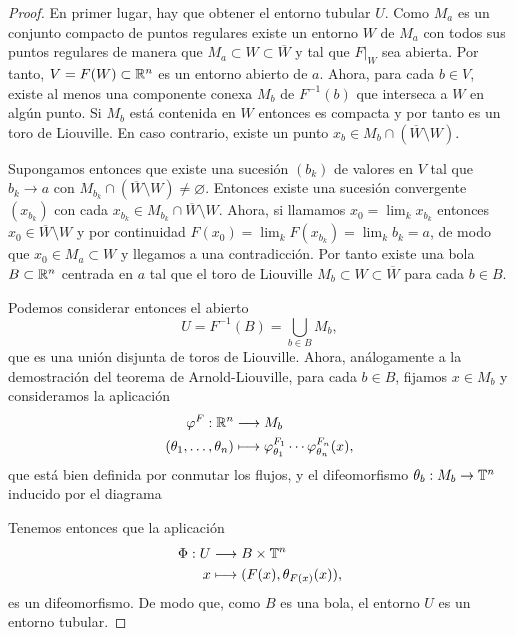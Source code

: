 \begin{proof}
  En primer lugar, hay que obtener el entorno tubular $U$. Como $M_a$ es un conjunto compacto de puntos regulares existe un entorno $W$ de $M_a$ con todos sus puntos regulares de manera que $M_a\subset W \subset \overline{W}$ y tal que $F|_W$ sea abierta. Por tanto, $V=F(W)\subset \mathbb{R}^n$ es un entorno abierto de $a$. Ahora, para cada $b\in V$, existe al menos una componente conexa $M_b$ de $F^{-1}(b)$ que interseca a $W$ en algún punto. Si $M_b$ está contenida en $W$ entonces es compacta y por tanto es un toro de Liouville. En caso contrario, existe un punto $x_b\in M_{b}\cap (\overline{W}\setminus W)$.
  
  Supongamos entonces que existe una sucesión $(b_k)$ de valores en $V$ tal que $b_k\rightarrow a$ con $M_{b_k}\cap(\overline{W}\setminus W) \neq \varnothing$. Entonces existe una sucesión convergente $(x_{b_k})$ con cada $x_{b_k}\in M_{b_k}\cap \overline{W}\setminus W$. Ahora, si llamamos $x_0=\lim_k x_{b_k}$ entonces $x_0\in \overline{W}\setminus W$ y por continuidad $F(x_0)=\lim_k F(x_{b_k})=\lim_k b_k =a$, de modo que $x_0 \in M_a\subset W$ y llegamos a una contradicción. Por tanto existe una bola $B\subset \mathbb{R}^n$ centrada en $a$ tal que el toro de Liouville $M_b\subset W \subset \overline{W}$ para cada $b\in B$. 
  
  Podemos considerar entonces el abierto 
  \begin{equation*}
    U=F^{-1}(B)=\bigcup_{b\in B}M_b,
  \end{equation*}
  que es una unión disjunta de toros de Liouville. Ahora, análogamente a la demostración del teorema de Arnold-Liouville, para cada $b\in B$, fijamos $x\in M_b$ y consideramos la aplicación
  \begin{align*}
    \varphi^F :\mathbb{R}^n&\longrightarrow M_b\\ 
    (\theta_1,\dots,\theta_n) &\longmapsto \varphi_{\theta_1}^{F_1}\cdots \varphi_{\theta_n}^{F_n}(x), 
    \end{align*}
    que está bien definida por conmutar los flujos, y el difeomorfismo $\theta_b:M_b\rightarrow \mathbb{T}^n$ inducido por el diagrama
    \begin{center}
     \end{center}
     Tenemos entonces que la aplicación
     \begin{align*}
       \Phi :U&\longrightarrow B\times \mathbb{T}^n\\ 
       x &\longmapsto (F(x),\theta_{F(x)}(x)), 
       \end{align*}
       es un difeomorfismo. De modo que, como $B$ es una bola, el entorno $U$ es un entorno tubular.


\end{proof}
